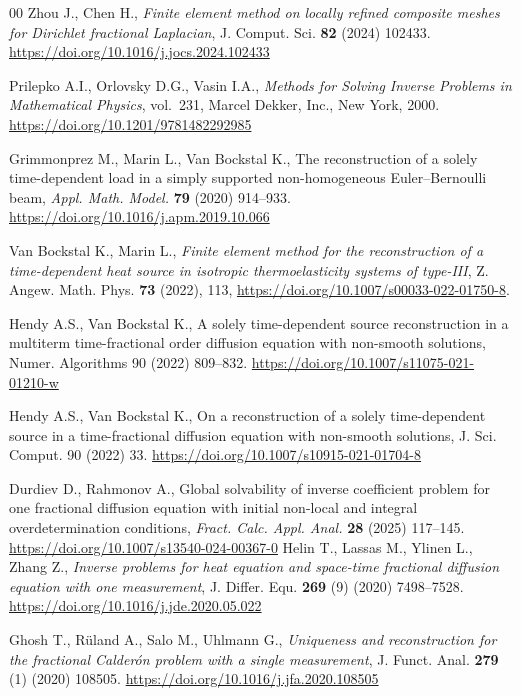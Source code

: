 \documentclass[reqno]{amsart}
\begin{document}
\begin{thebibliography}{00}
Zhou J., Chen H., \textit{Finite element method on locally refined composite meshes for Dirichlet fractional Laplacian}, J. Comput. Sci. \textbf{82} (2024) 102433.
\url{https://doi.org/10.1016/j.jocs.2024.102433}


Prilepko A.I., Orlovsky D.G., Vasin I.A., \textit{Methods for Solving Inverse Problems in Mathematical Physics}, 
vol.~231, Marcel Dekker, Inc., New York, 2000.
\url{https://doi.org/10.1201/9781482292985}

Grimmonprez M., Marin L., Van Bockstal K., The reconstruction of a solely time-dependent load in a simply supported non-homogeneous Euler–Bernoulli beam, \textit{Appl. Math. Model.} \textbf{79} (2020) 914--933. \url{https://doi.org/10.1016/j.apm.2019.10.066}

Van Bockstal K., Marin L., \textit{Finite element method for the reconstruction of a time-dependent heat source in isotropic thermoelasticity systems of type-III},  
Z. Angew. Math. Phys. \textbf{73} (2022), 113, \url{https://doi.org/10.1007/s00033-022-01750-8}.

Hendy A.S., Van Bockstal K., A solely time-dependent source reconstruction in a multiterm time-fractional order diffusion equation with non-smooth solutions, Numer. Algorithms 90 (2022) 809–832. \url{https://doi.org/10.1007/s11075-021-01210-w}

Hendy A.S., Van Bockstal K., On a reconstruction of a solely time-dependent source in a time-fractional diffusion equation with non-smooth solutions, J. Sci. Comput. 90 (2022) 33. \url{https://doi.org/10.1007/s10915-021-01704-8}

Durdiev D., Rahmonov A., Global solvability of inverse coefficient problem for one fractional diffusion equation with initial non-local and integral overdetermination conditions,  \textit{Fract. Calc. Appl. Anal.} \textbf{28} (2025) 117--145. \url{https://doi.org/10.1007/s13540-024-00367-0}
Helin T., Lassas M., Ylinen L., Zhang Z., \textit{Inverse problems for heat equation and space-time fractional diffusion equation with one measurement}, J. Differ. Equ. \textbf{269} (9) (2020) 7498--7528. \url{https://doi.org/10.1016/j.jde.2020.05.022}

Ghosh T., Rüland A., Salo M., Uhlmann G., \textit{Uniqueness and reconstruction for the fractional Calderón problem with a single measurement}, J. Funct. Anal. \textbf{279} (1) (2020) 108505. \url{https://doi.org/10.1016/j.jfa.2020.108505}


\end{thebibliography}
\end{document}
